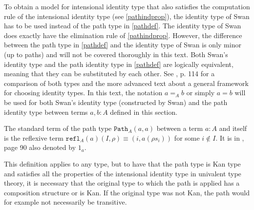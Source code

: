 \documentclass[12pt,a4paper,twoside,xetex]{book} %
\newcommand{\op}[1]{\mathtt{#1}}
\begin{document}
To obtain a model for intensional identity type that also satisfies the 
computation rule of the intensional identity type (see \cref{pathindprop}), the 
identity type of Swan \cite{Swan2014} has to be used instead of the path type 
in \cref{pathdef}. The identity type of Swan does exactly have the elimination 
rule of \cref{pathindprop}. However, the difference between the path type in 
\cref{pathdef} and the identity type of Swan is only minor (up to paths) and 
will not be covered thoroughly in this text. Both Swan's identity type and the 
path identity type in \cref{pathdef} are logically equivalent, meaning that 
they can be substituted by each other. See  \cite{Huber2016}, p. 114 for a 
comparison of both types and the more advanced text \cite{Swa18} about a 
general framework for choosing identity types. In this text, the notation $a 
=_A b$ or simply $a = b$ will be used for both Swan's identity type 
(constructed by Swan) and the path identity type between terms $a, b: A$ defined 
in this section. 

The standard term of the path type $\op{Path}_A(a,a)$ between a term $a : A$ 
and itself  is the reflexive term $\op{refl}_A(a)(I,\rho) \equiv (i, a(\rho 
s_i))$ for some $i \not \in I$. It is in \cite{Huber2016}, page 90 also denoted 
by $1_a$.

This definition applies to any type, but to have that the path type is Kan type 
and satisfies all the properties of the intensional identity type in univalent 
type theory, it is necessary that the original type to which the path is 
applied has a composition structure or is Kan. If the original type was not 
Kan, the path would for example not necessarily be transitive. 
\end{document}
